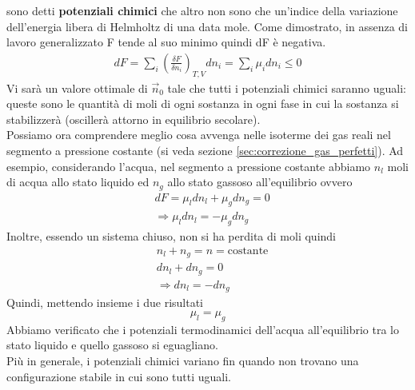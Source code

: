 \documentclass[
10pt, %
a4paper, %
oneside, %
headinclude,footinclude, %
BCOR5mm, %
]{scrartcl}
\begin{document}
sono detti \textbf{potenziali chimici} che altro non sono che un'indice della variazione dell'energia libera di Helmholtz di una data mole. Come dimostrato, in assenza di lavoro generalizzato F tende al suo minimo quindi dF è negativa. 
\begin{align*}
	dF = \sum_i \left(\frac{\delta F}{\delta n_i}\right)_{T,V} dn_i = \sum_i \mu_i dn_i \leq 0
\end{align*}
Vi sarà un valore ottimale di $\vec{n}_0$ tale che tutti i potenziali chimici saranno uguali: queste sono le quantità di moli di ogni sostanza in ogni fase in cui la sostanza si stabilizzerà (oscillerà attorno in equilibrio secolare).\\
Possiamo ora comprendere meglio cosa avvenga nelle isoterme dei gas reali nel segmento a pressione costante (si veda sezione \ref{sec:correzione_gas_perfetti}). Ad esempio, considerando l'acqua, nel segmento a pressione costante abbiamo \(n_l\) moli di acqua allo stato liquido ed \(n_g\) allo stato gassoso all'equilibrio ovvero 
\begin{align*}
	&dF= \mu_l dn_l+ \mu_g dn_g = 0\\
	&\Rightarrow \mu_l dn_l = -\mu_g dn_g
\end{align*}
Inoltre, essendo un sistema chiuso, non si ha perdita di moli quindi 
\begin{align*}
	&n_l + n_g = n = \text{costante}\\
	&dn_l + dn_g = 0\\
	&\Rightarrow dn_l = -dn_g
\end{align*}
Quindi, mettendo insieme i due risultati
\[\mu_l = \mu_g\]
Abbiamo verificato che i potenziali termodinamici dell'acqua all'equilibrio tra lo stato liquido e quello gassoso si eguagliano.\\
 Più in generale, i potenziali chimici variano fin quando non trovano una configurazione stabile in cui sono tutti uguali. 
\end{document}
